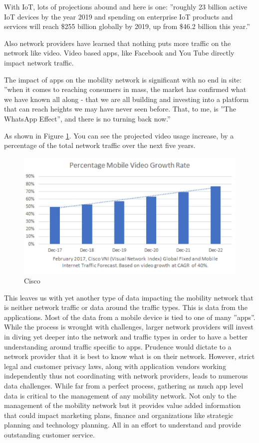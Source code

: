 \documentclass[sigconf]{acmart}
\begin{document}
With IoT, lots of projections abound and here is one: ''roughly 23 billion active IoT devices by the year 2019 and spending on enterprise IoT products and services will reach \$255 billion globally by 2019, up from \$46.2 billion this year.'' \cite{www-systemid-com}  

Also network providers have learned that nothing puts more traffic on the network like video.  Video based apps, like Facebook and You Tube directly impact network traffic. \cite{www-cisco-com} 


The impact of apps on the mobility network is significant with no end in site:  ''when it comes to reaching consumers in mass, the market has confirmed what we have known all along - that we are all building and investing into a platform that can reach heights we may have never seen before.  That, to me, is ''The WhatsApp Effect'', and there is no turning back now.'' \cite{www-techcrunch-com}

As shown in Figure \ref{f:Cisco}. You can see the projected video usage increase, by a percentage of the total network traffic over the next five years.

\begin{figure}[h]
\includegraphics[width=\columnwidth]{images/graph.png}
\caption{Cisco}\label{f:Cisco}
\end{figure}

This leaves us with yet another type of data impacting the mobility network that is neither network traffic or data around the traffic types.  This is data from the applications.  Most of the data from a mobile device is tied to one of many ''apps''.  While the process is wrought with challenges, larger network providers will invest in diving yet deeper into the network and traffic types in order to have a better understanding around traffic specific to apps.  Prudence would dictate to a network provider that it is best to know what is on their network.  However, strict legal and customer privacy laws, along with application vendors working independently thus not coordinating with network providers, leads to numerous data challenges.  While far from a perfect process, gathering as much app level data is critical to the management of any mobility network.  Not only to the management of the mobility network but it provides value added information that could impact marketing plans, finance and organizations like strategic planning and technology planning.  All in an effort to understand and provide outstanding customer service.
\end{document}
